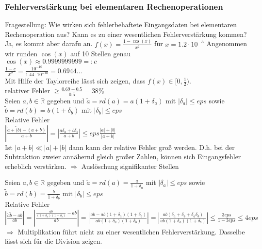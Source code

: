 \subsubsection{Fehlerverstärkung bei elementaren Rechenoperationen}
Fragestellung: Wie wirken sich fehlerbehaftete Eingangsdaten bei elementaren
Rechenoperation aus? Kann es zu einer wesentlichen Fehlerverstärkung kommen?
Ja, es kommt aber darafu an.
$ f(x)=\frac{1 - \cos(x)}{x^2} $ für $x=1.2 \cdot 10^{-5} $
Angenommen wir runden $\cos(x)$ auf 10 Stellen genau \\
$ \cos(x) \approx 0.999 999 999 9 =: c $ \\
$ \frac{1 - c}{x^2} = \frac{10^{-10}}{1.44 \cdot 10^{-10}} = 0.6944\dots $ \\
Mit Hilfe der Taylorreihe lässt sich zeigen, dass $ f(x) \in [0, \frac{1}{2}) $. \\
relativer Fehler $ \geq \frac{0.69 - 0.5}{0.5} = 38\% $ \\

Seien $ a, b \in \mathbb{R} $ gegeben und
$ \tilde{a} = rd(a) = a (1 + \delta_{a}) $ mit $ | \delta_{a} | \leq eps $ sowie
$ \tilde{b} = rd(b) = b (1 + \delta_{b}) $ mit $ | \delta_{b} | \leq eps $ \\
Relative Fehler\\
$ | \frac{\tilde{a} + \tilde(b) - (a + b)}{a + b} | =
| \frac{a\delta_{a} + b\delta_{b}}{a + b} | \leq eps \frac{|a| + |b|}{|a + b|} $ \\
Ist $ |a + b| \ll |a| + |b| $ dann kann der relative Fehler groß werden.
D.h. bei der Subtraktion zweier annähernd gleich großer Zahlen, können
sich Eingangsfehler erheblich verstärken. $\Rightarrow$ Auslöschung
signifikanter Stellen

Seien $ a, b \in \mathbb{R} $ gegeben und
$ \tilde{a} = rd(a) = \frac{a}{1 + \delta_{a}} $ mit $ | \delta_{a} | \leq eps $ sowie
$ \tilde{b} = rd(b) = \frac{b}{1 + \delta_{b}} $ mit $ | \delta_{b} | \leq eps $ \\
Relative Fehler\\
$ | \frac{\tilde{a}\tilde{b} - a b}{a b} | =
| \frac{\frac{ab}{(1 + \delta_{a})(1 + \delta_{b})} - ab}{ab}| =
| \frac{ab - ab(1 + \delta_{a})(1 + \delta_{b})}{ab(1 + \delta_{a})(1 + \delta_{b})} | =
| \frac{ab(\delta_{a} + \delta_{b} + \delta_{a}\delta_{b})}{ab(1 + \delta_{a})(1 + \delta_{b})} | \leq
\frac{3eps}{1 - 3eps} \leq 4eps $ \\
$\Rightarrow$ Multiplikation führt nicht zu einer wesentlichen Fehlerverstärkung.
Dasselbe lässt sich für die Division zeigen.

